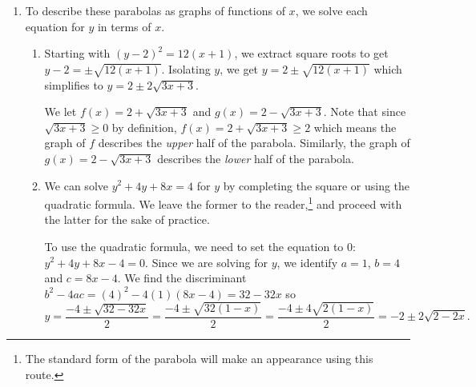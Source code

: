 \documentclass{ximera}
\begin{document}
\begin{example}
\begin{explanation}
\begin{enumerate}
\begin{enumerate}
 


Since the focal length is  $|p| = 2$, the focus is $2$ units to the left of the vertex.   From $(1,-2)$ and move left $2$ units and arrive at the focus $(1-2,-2) = (-1,-2)$.  Similarly, the directrix is $2$ units to the right of the vertex, the vertical line $x=1+2 = 3$.  


 

Since the focal diameter is $|4p|$ is $8$, the parabola is $8$ units wide at the focus.  Starting at the focus $(-1,-2)$ we move down $4$ units and get $(-1,-2-4) = (-1,-6)$.  Moving up $4$ units from the focus we get $(-1,-2+4) = (-1,2)$.  Hence, $(-1,-6)$ and $(-1,2)$ are the endpoints of the latus rectum. The final graph is below.


\begin{center}
\end{center}

\end{enumerate}

\item To describe these parabolas as graphs of functions of $x$, we solve each equation for $y$ in terms of $x$.  

\begin{enumerate}

\item Starting with $(y-2)^2 = 12(x+1)$, we extract square roots to get $y - 2 = \pm \sqrt{12(x+1)}$.   Isolating $y$, we get   $y = 2 \pm \sqrt{12(x+1)}$ which simplifies to $y = 2 \pm 2 \sqrt{3x+3}$.  


 

We let $f(x) = 2 + \sqrt{3x+3}$ and $g(x) = 2-\sqrt{3x+3}$. Note that since $\sqrt{3x+3} \geq 0$ by definition, $f(x) = 2 + \sqrt{3x+3} \geq 2$ which means the graph of $f$ describes the \textit{upper} half of the parabola.  Similarly, the graph of $g(x) = 2 - \sqrt{3x+3}$ describes the \textit{lower} half of the parabola.


 

\item We can solve $y^2 + 4y + 8x = 4$ for $y$ by completing the square or using the quadratic formula.  We leave the former to the reader,\footnote{The standard form of the parabola will make an appearance using this route.} and proceed with the latter for the sake of practice.


 

To use the quadratic formula, we need to set the equation to $0$:  $y^2 + 4y + 8x-4 = 0$.  Since we are solving for $y$, we identify $a = 1$, $b=4$ and $c = 8x-4$.  We find the discriminant $b^2-4ac = (4)^2 - 4(1)(8x-4) = 32-32x$ so \[ y = \frac{-4 \pm \sqrt{32-32x}}{2} = \frac{-4 \pm \sqrt{32(1-x)}}{2}  = \frac{-4 \pm 4\sqrt{2(1-x)}}{2} = -2 \pm 2 \sqrt{2-2x}. \]


\end{enumerate}
\end{enumerate}
\end{explanation}
\end{example}
\end{document}
